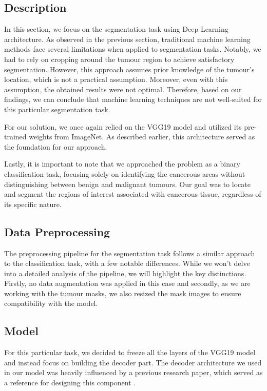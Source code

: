 \subsection{Description}
In this section, we focus on the segmentation task using Deep Learning architecture. As observed in the previous section, traditional machine learning methods face several limitations when applied to segmentation tasks. Notably, we had to rely on cropping around the tumour region to achieve satisfactory segmentation. However, this approach assumes prior knowledge of the tumour's location, which is not a practical assumption. Moreover, even with this assumption, the obtained results were not optimal. Therefore, based on our findings, we can conclude that machine learning techniques are not well-suited for this particular segmentation task. 

For our solution, we once again relied on the VGG19 model and utilized its pre-trained weights from ImageNet. As described earlier, this architecture served as the foundation for our approach. 

Lastly, it is important to note that we approached the problem as a binary classification task, focusing solely on identifying the cancerous areas without distinguishing between benign and malignant tumours. Our goal was to locate and segment the regions of interest associated with cancerous tissue, regardless of its specific nature.

\subsection{Data Preprocessing}
The preprocessing pipeline for the segmentation task follows a similar approach to the classification task, with a few notable differences. While we won't delve into a detailed analysis of the pipeline, we will highlight the key distinctions. Firstly, no data augmentation was applied in this case and secondly, as we are working with the tumour masks, we also resized the mask images to ensure compatibility with the model.

\subsection{Model}
For this particular task, we decided to freeze all the layers of the VGG19 model and instead focus on building the decoder part. The decoder architecture we used in our model was heavily influenced by a previous research paper, which served as a reference for designing this component \cite{decoder}.

